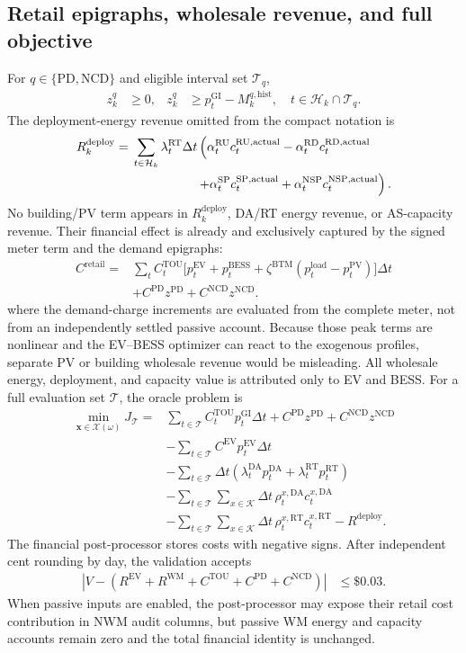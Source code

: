\documentclass[final,5p,times]{elsarticle}
\newcommand{\dt}{\Delta t}
\newcommand{\EV}{\mathrm{EV}}
\newcommand{\BESS}{\mathrm{BESS}}
\newcommand{\DA}{\mathrm{DA}}
\newcommand{\RT}{\mathrm{RT}}
\newcommand{\GI}{\mathrm{GI}}
\newcommand{\PV}{\mathrm{PV}}
\newcommand{\TOU}{\mathrm{TOU}}
\newcommand{\PD}{\mathrm{PD}}
\newcommand{\NCD}{\mathrm{NCD}}
\newcommand{\RU}{\mathrm{RU}}
\newcommand{\RD}{\mathrm{RD}}
\newcommand{\SP}{\mathrm{SP}}
\newcommand{\NSP}{\mathrm{NSP}}
\newcommand{\WM}{\mathrm{WM}}
\newcommand{\actual}{\mathrm{actual}}
\newcommand{\hist}{\mathrm{hist}}
\newcommand{\load}{\mathrm{load}}
\newcommand{\calT}{\mathcal{T}}
\newcommand{\calH}{\mathcal{H}}
\newcommand{\calK}{\mathcal{K}}
\begin{document}
\subsection{Retail epigraphs, wholesale revenue, and full objective}
For $q\in\{\PD,\NCD\}$ and eligible interval set $\calT_q$,
\begin{align}
z_k^q&\ge0,&
z_k^q&\ge p_t^{\GI}-M_k^{q,\hist},\quad
t\in\calH_k\cap\calT_q. \label{eq:app_demand_epigraph}
\end{align}
The deployment-energy revenue omitted from the compact notation is
\begin{align}
R_k^{\mathrm{deploy}}
={}&\sum_{t\in\calH_k}\lambda_t^{\RT}\dt
\left(\alpha_t^{\RU}c_t^{\RU,\actual}
-\alpha_t^{\RD}c_t^{\RD,\actual}\right.\nonumber\\
&\left.\hspace{18mm}+\alpha_t^{\SP}c_t^{\SP,\actual}
+\alpha_t^{\NSP}c_t^{\NSP,\actual}\right). \label{eq:app_deployment_revenue}
\end{align}
No building/PV term appears in $R_k^{\mathrm{deploy}}$, DA/RT energy revenue,
or AS-capacity revenue. Their financial effect is already and exclusively
captured by the signed meter term and the demand epigraphs:
\begin{align}
C^{\mathrm{retail}}
={}&\sum_t C_t^{\TOU}
\bigl[p_t^{\EV}+p_t^{\BESS}
+\zeta^{\mathrm{BTM}}(p_t^{\load}-p_t^{\PV})\bigr]\dt\nonumber\\
&+C^{\PD}z^{\PD}+C^{\NCD}z^{\NCD}.
\label{eq:app_passive_retail_effect}
\end{align}
where the demand-charge increments are evaluated from the complete meter, not
from an independently settled passive account. Because those peak terms are
nonlinear and the EV--BESS optimizer can react to the exogenous profiles,
separate PV or building wholesale revenue would be misleading. All wholesale
energy, deployment, and capacity value is attributed only to EV and BESS.
For a full evaluation set $\calT$, the oracle problem is
\begin{align}
\min_{\boldsymbol{x}\in\mathcal{X}(\omega)}J_{\calT}
={}&\sum_{t\in\calT} C_t^{\TOU}p_t^{\GI}\dt
+C^{\PD}z^{\PD}+C^{\NCD}z^{\NCD}\nonumber\\
&-\sum_{t\in\calT}C^{\EV}p_t^{\EV}\dt\nonumber\\
&-\sum_{t\in\calT}\dt
\left(\lambda_t^{\DA}p_t^{\DA}
+\lambda_t^{\RT}p_t^{\RT}\right)\nonumber\\
&-\sum_{t\in\calT}\sum_{x\in\calK}\dt\,
\rho_t^{x,\DA}c_t^{x,\DA}\nonumber\\
&-\sum_{t\in\calT}\sum_{x\in\calK}\dt\,
\rho_t^{x,\RT}c_t^{x,\RT}
-R^{\mathrm{deploy}}. \label{eq:full_objective}
\end{align}
The financial post-processor stores costs with negative signs. After independent
cent rounding by day, the validation accepts
\begin{align}
\left|V-\left(R^{\EV}+R^{\WM}+C^{\TOU}
+C^{\PD}+C^{\NCD}\right)\right|
&\le \$0.03. \label{eq:rounding}
\end{align}
When passive inputs are enabled, the post-processor may expose their retail
cost contribution in NWM audit columns, but passive WM energy and capacity
accounts remain zero and the total financial identity is unchanged.
\end{document}

